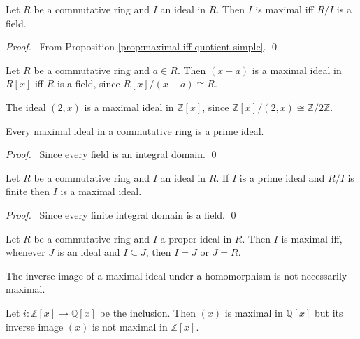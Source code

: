 \begin{prop}
Let $R$ be a commutative ring and $I$ an ideal in $R$. Then $I$ is maximal iff $R/I$ is a field.
\end{prop}

\begin{proof}
\pf\ From Proposition \ref{prop:maximal-iff-quotient-simple}. \qed
\end{proof}

\begin{ex}
\label{ex:x-minus-a-maximal}
Let $R$ be a commutative ring and $a \in R$. Then $(x-a)$ is a maximal ideal in $R[x]$ iff $R$ is a field, since $R[x]/(x-a) \cong R$.
\end{ex}

\begin{ex}
The ideal $(2,x)$ is a maximal ideal in $\mathbb{Z}[x]$, since $\mathbb{Z}[x] / (2,x) \cong \mathbb{Z} / 2 \mathbb{Z}$.
\end{ex}

\begin{prop}
Every maximal ideal in a commutative ring is a prime ideal.
\end{prop}

\begin{proof}
\pf\ Since every field is an integral domain. \qed
\end{proof}

\begin{prop}
Let $R$ be a commutative ring and $I$ an ideal in $R$. If $I$ is a prime ideal and $R/I$ is finite then $I$ is a maximal ideal.
\end{prop}

\begin{proof}
\pf\ Since every finite integral domain is a field. \qed
\end{proof}

\begin{prop}
Let $R$ be a commutative ring and $I$ a proper ideal in $R$. Then $I$ is maximal iff, whenever $J$ is an ideal and $I \subseteq J$, then $I = J$ or $J = R$.
\end{prop}


\begin{ex}
The inverse image of a maximal ideal under a homomorphism is not necessarily maximal.

Let $i : \mathbb{Z}[x] \rightarrow \mathbb{Q}[x]$ be the inclusion. Then $(x)$ is maximal in $\mathbb{Q}[x]$ but its inverse image $(x)$ is not maximal in $\mathbb{Z}[x]$.
\end{ex}

